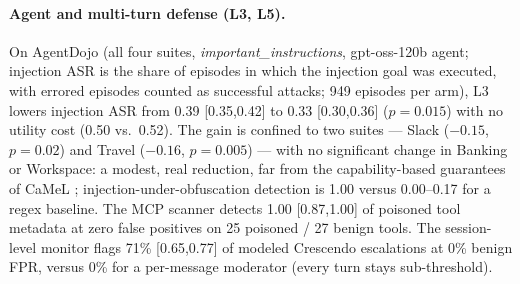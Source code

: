 \documentclass[11pt]{article}
\begin{document}
\paragraph{Agent and multi-turn defense (L3, L5).} On AgentDojo (all four suites, \emph{important\_instructions},
gpt-oss-120b agent; injection ASR is the share of episodes in which the injection goal was executed, with
errored episodes counted as successful attacks; 949 episodes per arm), L3 lowers injection ASR from 0.39
[0.35,0.42] to 0.33 [0.30,0.36] ($p{=}0.015$) with no utility cost (0.50 vs.\ 0.52). The gain is confined to
two suites --- Slack ($-0.15$, $p{=}0.02$) and Travel ($-0.16$, $p{=}0.005$) --- with no significant change
in Banking or Workspace: a modest, real reduction, far from the capability-based guarantees of
CaMeL \citep{camel}; injection-under-obfuscation
detection is 1.00 versus 0.00--0.17 for a regex baseline. The MCP scanner detects 1.00 [0.87,1.00] of
poisoned tool metadata at zero false positives on 25 poisoned / 27 benign tools. The session-level
monitor flags 71\% [0.65,0.77] of modeled Crescendo escalations at 0\% benign FPR, versus 0\% for a
per-message moderator (every turn stays sub-threshold).
\end{document}
